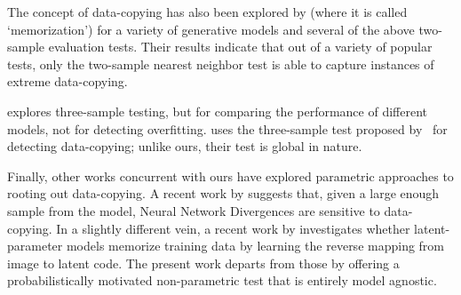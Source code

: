 The concept of data-copying has also been explored by \cite{Kilian} (where it is called `memorization') for a variety of generative models and several of the above two-sample evaluation tests. Their results indicate that out of a variety of popular tests, only the two-sample nearest neighbor test is able to capture instances of extreme data-copying. 

\cite{gretton_2} explores three-sample testing, but for comparing the performance of different models, not for detecting overfitting. \cite{reviewer_paper} uses the three-sample test proposed by~\cite{gretton_2} for detecting data-copying; unlike ours, their test is global in nature. 


 Finally, other works concurrent with ours have explored parametric approaches to rooting out data-copying. A recent work by \cite{GAN_benchmarks} suggests that, given a large enough sample from the model, Neural Network Divergences are sensitive to data-copying. In a slightly different vein, a recent work by \cite{latent_recovery} investigates whether latent-parameter models memorize training data by learning the reverse mapping from image to latent code. The present work departs from those by offering a probabilistically motivated non-parametric test that is entirely model agnostic.
 
 

